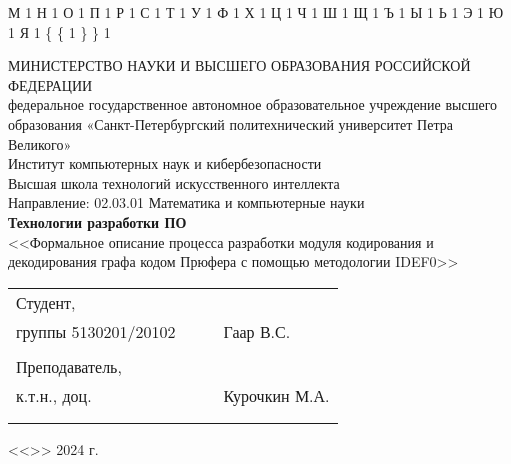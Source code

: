 \documentclass[a4paper, final]{article}
\begin{document}
{  {М}{ {\selectfont{}} }1
  {Н}{ {\selectfont{}} }1
  {О}{ {\selectfont{}} }1
  {П}{ {\selectfont{}} }1
  {Р}{ {\selectfont{}} }1
  {С}{ {\selectfont{}} }1
  {Т}{ {\selectfont{}} }1
  {У}{ {\selectfont{}} }1
  {Ф}{ {\selectfont{}} }1
  {Х}{ {\selectfont{}} }1
  {Ц}{ {\selectfont{}} }1
  {Ч}{ {\selectfont{}} }1
  {Ш}{ {\selectfont{}} }1
  {Щ}{ {\selectfont{}} }1
  {Ъ}{ {\selectfont{}} }1
  {Ы}{ {\selectfont{}} }1
  {Ь}{ {\selectfont{}} }1
  {Э}{ {\selectfont{}} }1
  {Ю}{ {\selectfont{}} }1
  {Я}{ {\selectfont{}} }1
  {\{}{ { {\color{brackets}\{} } }1 %
  {\} }{ { {\color{brackets}\} } } }1 %
}

\begin{center}
\hfill \break
\hfill \break
\normalsize{МИНИСТЕРСТВО НАУКИ И ВЫСШЕГО ОБРАЗОВАНИЯ РОССИЙСКОЙ ФЕДЕРАЦИИ\\
 федеральное государственное автономное образовательное учреждение высшего образования «Санкт-Петербургский политехнический университет Петра Великого»\\[5pt]}
\normalsize{Институт компьютерных наук и кибербезопасности}\\[5pt] 
\normalsize{Высшая школа технологий искусственного интеллекта}\\[5pt] 
\normalsize{Направление: 02.03.01 Математика и компьютерные науки}\\

\hfill \break
\hfill \break
\hfill \break
\large{\textbf{Технологии разработки ПО}}\\
\hfill \break
\large{<<Формальное описание процесса разработки модуля кодирования и декодирования графа кодом Прюфера с помощью методологии IDEF0>>}\\

\hfill \break
\hfill \break
\end{center}
 
\small{ 
\begin{tabular}{lrrl}
\!\!\!Студент, & \hspace{2cm} & & \\
\!\!\!группы 5130201/20102 & \hspace{2cm} & \underline{\hspace{3cm}} & Гаар В.С. \\\\
\!\!\!Преподаватель, \hspace{2cm} & & \\
\!\!\!к.т.н., доц. & \hspace{2cm} & \underline{\hspace{3cm}} &  Курочкин М.А. \\\\
&&\hspace{5cm}
\end{tabular}
\begin{flushright}
<<\underline{\hspace{1cm}}>>\underline{\hspace{2.5cm}} 2024 г.
\end{flushright}
}
\end{document}
